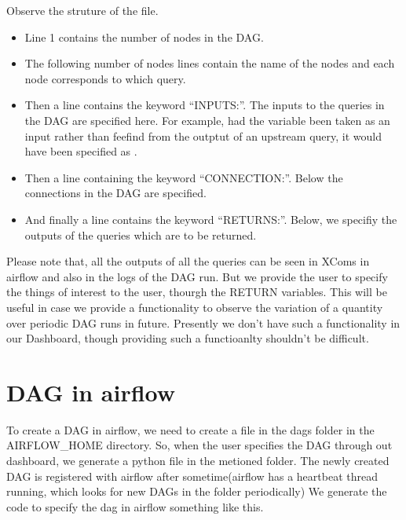 \documentclass[letterpaper,10pt,english]{sphinxmanual}
\begin{document}
Observe the struture of the file.
\begin{itemize}
\item {} 
Line 1 contains the number of nodes in the DAG.

\item {} 
The following number of nodes lines contain the name of the nodes and  each node corresponds to which query.

\item {} 
Then a line contains the keyword “INPUTS:”. The inputs to the queries in the DAG are specified here. For example, had the  variable been taken as an input rather than feefind from the outptut of an upstream query, it would have been specified as .

\item {} 
Then a line containing the keyword “CONNECTION:”. Below the connections in the DAG are specified.

\item {} 
And finally a line contains the keyword “RETURNS:”. Below, we specifiy the outputs of the queries which are to be returned.

\end{itemize}

Please note that, all the outputs of all the queries can be seen in XComs in airflow and also in the logs of the DAG run. But we provide the user to specify the things of interest to the user, thourgh the RETURN variables. This will be useful in case we provide a functionality to observe the variation of a quantity over periodic DAG runs in future. Presently we don’t have such a functionality in our Dashboard, though providing such a functioanlty shouldn’t be difficult.


\section{DAG in airflow}
\label{\detokenize{dag:dag-in-airflow}}
To create a DAG in airflow, we need to create a file in the dags folder in the AIRFLOW\_HOME directory. So, when the user specifies the DAG through out dashboard, we generate a python file in the metioned folder. The newly created DAG is registered with airflow after sometime(airflow has a heartbeat thread running, which looks for new DAGs in the folder periodically)
We generate the code to specify the dag in airflow something like this.
\end{document}
